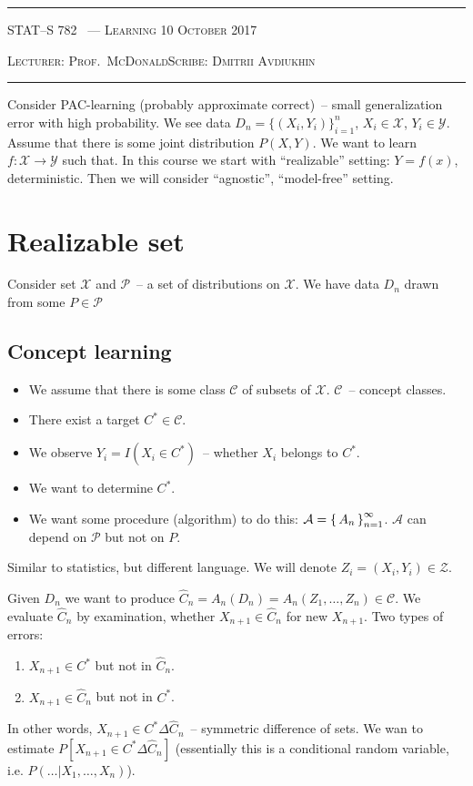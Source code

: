\documentclass[10pt]{article}
\newcounter{lecnum}
\newcommand{\X}{\mathcal{X}}
\newcommand{\Y}{\mathcal{Y}}
\renewcommand{\hat}{\widehat}
\newcommand{\A}{\mathcal{A}}
\newcommand{\Pcal}{\mathcal{P}}
\newcommand{\Z}{\mathcal{Z}}
\newcommand{\C}{\mathcal{C}}
\newcommand{\lecturer}{Prof.\ McDonald}
\newcommand{\scribe}{Dmitrii Avdiukhin}
\newcommand{\chtitle}{Learning}
\newcommand{\lecdate}{10 October 2017}
\begin{document}
\rule{6.5in}{1pt}

\textsc{STAT--S 782
        \hfill \thelecnum\ --- \chtitle
        \hfill \lecdate}

\textsc{Lecturer: \lecturer \hfill Scribe: \scribe}
\rule{6.5in}{1pt}

Consider PAC-learning (probably approximate correct)~-- small generalization error with high probability.
We see data $D_n = \{(X_i, Y_i)\}_{i=1}^n$, $X_i \in \X$, $Y_i \in \Y$.
Assume that there is some joint distribution $P(X,Y)$.
We want to learn $f: \X \to \Y$ such that.
In this course we start with ``realizable'' setting: $Y = f(x)$, deterministic.
Then we will consider ``agnostic'', ``model-free'' setting.

\section{Realizable set}

Consider set $\X$ and $\mathcal P$~-- a set of distributions on $\X$.
We have data $D_n$ drawn from some $P \in \Pcal$

\subsection{Concept learning}
\begin{itemize}
  \item We assume that there is some class $\C$ of subsets of $\X$. $\C$~-- concept classes.
  \item There exist a target $C^* \in \C$.
  \item We observe $Y_i = I(X_i \in C^*)$~-- whether $X_i$  belongs to $C^*$.
  \item We want to determine $C^*$.
  \item We want some procedure (algorithm) to do this: $\A = \set{A_n}_{n=1}^\infty$.
        $\A$ can depend on $\Pcal$ but not on $P$.
\end{itemize}
Similar to statistics, but different language.
We will denote $Z_i = (X_i, Y_i) \in \Z$.

Given $D_n$ we want to produce $\hat{C}_n = A_n(D_n) = A_n(Z_1, \ldots, Z_n) \in \C$.
We evaluate $\hat{C}_n$ by examination, whether $X_{n+1} \in \hat{C}_n$ for new $X_{n+1}$.
Two types of errors:
\begin{enumerate}
  \item $X_{n+1} \in C^*$ but not in $\hat C_n$.
  \item $X_{n+1} \in \hat C_n$ but not in $C^*$.
\end{enumerate}
In other words, $X_{n+1} \in C^* \Delta \hat C_n$~-- symmetric difference of sets.
We wan to estimate $P[X_{n+1} \in C^* \Delta \hat C_n]$ (essentially this is a conditional random variable, i.e. $P(\ldots | X_1, \ldots, X_n)$).
\end{document}
